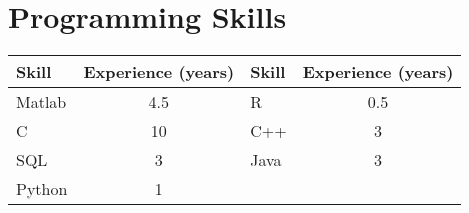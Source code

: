 \documentclass[10pt,letterpaper]{article}
\begin{document}
\section*{Programming Skills}
\begin{table}[htb!]
  \centering
  \begin{tabular}{|l|c|| l |c|}
    \hline
    Skill & Experience (years) & Skill & Experience (years) \\
    \hline
    Matlab & 4.5 & R & 0.5 \\
    C & 10 & C++ & 3 \\
    SQL & 3 & Java & 3 \\
    Python & 1 &&\\
    \hline
  \end{tabular}
\end{table}






\end{document}
